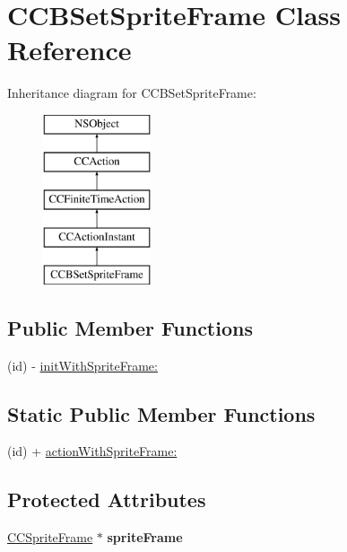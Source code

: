 \hypertarget{interface_c_c_b_set_sprite_frame}{\section{C\-C\-B\-Set\-Sprite\-Frame Class Reference}
\label{interface_c_c_b_set_sprite_frame}
}
Inheritance diagram for C\-C\-B\-Set\-Sprite\-Frame\-:\begin{figure}[H]
\begin{center}
\leavevmode
\includegraphics[height=5.000000cm]{interface_c_c_b_set_sprite_frame}
\end{center}
\end{figure}
\subsection*{Public Member Functions}
\begin{DoxyCompactItemize}
\item 
(id) -\/ \hyperlink{interface_c_c_b_set_sprite_frame_a69620b407fa23696865403207231310f}{init\-With\-Sprite\-Frame\-:}
\end{DoxyCompactItemize}
\subsection*{Static Public Member Functions}
\begin{DoxyCompactItemize}
\item 
(id) + \hyperlink{interface_c_c_b_set_sprite_frame_a5674ce86b30710f31841bb5cb446100b}{action\-With\-Sprite\-Frame\-:}
\end{DoxyCompactItemize}
\subsection*{Protected Attributes}
\begin{DoxyCompactItemize}
\item 
\hypertarget{interface_c_c_b_set_sprite_frame_a8abe3b2186605fff5eb38f43267d4c89}{\hyperlink{interface_c_c_sprite_frame}{C\-C\-Sprite\-Frame} $\ast$ {\bfseries sprite\-Frame}}\label{interface_c_c_b_set_sprite_frame_a8abe3b2186605fff5eb38f43267d4c89}

\end{DoxyCompactItemize}


